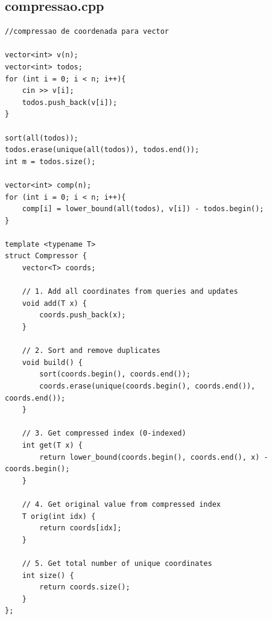 \documentclass[11pt, a4paper, twoside]{article}
\begin{document}
\subsection{compressao.cpp}
\begin{lstlisting}
//compressao de coordenada para vector

vector<int> v(n);
vector<int> todos;
for (int i = 0; i < n; i++){
    cin >> v[i];
    todos.push_back(v[i]);
}

sort(all(todos));
todos.erase(unique(all(todos)), todos.end());
int m = todos.size();

vector<int> comp(n);
for (int i = 0; i < n; i++){
    comp[i] = lower_bound(all(todos), v[i]) - todos.begin();
}

template <typename T>
struct Compressor {
    vector<T> coords;
    
    // 1. Add all coordinates from queries and updates
    void add(T x) { 
        coords.push_back(x); 
    }
    
    // 2. Sort and remove duplicates
    void build() {
        sort(coords.begin(), coords.end());
        coords.erase(unique(coords.begin(), coords.end()), coords.end());
    }
    
    // 3. Get compressed index (0-indexed)
    int get(T x) {
        return lower_bound(coords.begin(), coords.end(), x) - coords.begin();
    }
    
    // 4. Get original value from compressed index
    T orig(int idx) {
        return coords[idx];
    }
    
    // 5. Get total number of unique coordinates
    int size() {
        return coords.size();
    }
};
\end{lstlisting}
\end{document}
